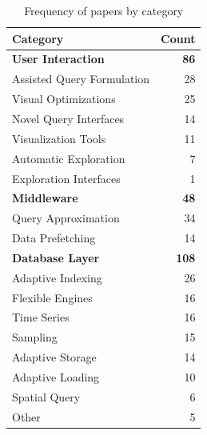 \begin{table}[hptb]
  \small
  \begin{tabularx}{\textwidth}{X r} \hline
    \textbf{Category} & \textbf{Count} \\ \hline
    \textbf{User Interaction} & \textbf{86} \\
      \hspace{0.5em} Assisted Query Formulation & 28 \\
      \hspace{0.5em} Visual Optimizations & 25 \\
      \hspace{0.5em} Novel Query Interfaces & 14 \\
      \hspace{0.5em} Visualization Tools & 11 \\
      \hspace{0.5em} Automatic Exploration & 7 \\
      \hspace{0.5em} Exploration Interfaces & 1 \\
    \textbf{Middleware} & \textbf{48} \\
      \hspace{0.5em} Query Approximation & 34 \\
      \hspace{0.5em} Data Prefetching & 14 \\
    \textbf{Database Layer} & \textbf{108} \\
      \hspace{0.5em} Adaptive Indexing & 26 \\
      \hspace{0.5em} Flexible Engines & 16 \\
      \hspace{0.5em} Time Series & 16 \\
      \hspace{0.5em} Sampling & 15 \\
      \hspace{0.5em} Adaptive Storage & 14 \\
      \hspace{0.5em} Adaptive Loading & 10 \\
      \hspace{0.5em} Spatial Query & 6 \\
      \hspace{0.5em} Other & 5
  \end{tabularx}
  \caption{Frequency of  papers by category}\label{tab:mapping/category_summary}
\end{table}

